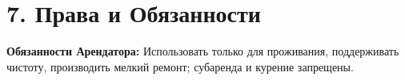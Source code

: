 \section*{7. Права и Обязанности}
\textbf{Обязанности Арендатора:} Использовать только для проживания, поддерживать чистоту, производить мелкий ремонт; субаренда и курение запрещены.
